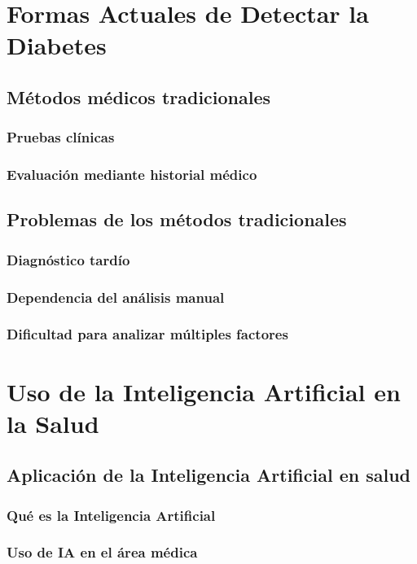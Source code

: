 \section{Formas Actuales de Detectar la Diabetes}

\subsection{M\'etodos m\'edicos tradicionales}
\subsubsection{Pruebas cl\'inicas}
\subsubsection{Evaluaci\'on mediante historial m\'edico}

\subsection{Problemas de los m\'etodos tradicionales}
\subsubsection{Diagn\'ostico tard\'io}
\subsubsection{Dependencia del an\'alisis manual}
\subsubsection{Dificultad para analizar m\'ultiples factores}

\section{Uso de la Inteligencia Artificial en la Salud}

\subsection{Aplicaci\'on de la Inteligencia Artificial en salud}
\subsubsection{Qu\'e es la Inteligencia Artificial}
\subsubsection{Uso de IA en el \'area m\'edica}

